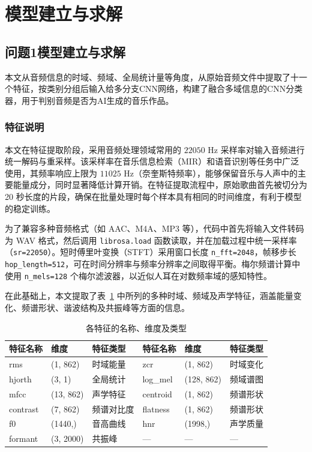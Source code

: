 \documentclass[a4paper,12pt]{article}
\begin{document}
\section{模型建立与求解}
\subsection{问题1模型建立与求解}
本文从音频信息的时域、频域、全局统计量等角度，从原始音频文件中提取了十一个特征，按类别分组后输入给多分支CNN网络，构建了融合多域信息的CNN分类器，用于判别音频是否为AI生成的音乐作品。


\subsubsection{特征说明}
本文在特征提取阶段，采用音频处理领域常用的 $22050$ Hz 采样率对输入音频进行统一解码与重采样。该采样率在音乐信息检索（MIR）和语音识别等任务中广泛使用，其频率响应上限为 $11025$ Hz（奈奎斯特频率），能够保留音乐与人声中的主要能量成分，同时显著降低计算开销。在特征提取流程中，原始歌曲首先被切分为 20 秒长度的片段，确保在批量处理时每个样本具有相同的时间维度，有利于模型的稳定训练。

为了兼容多种音频格式（如 AAC、M4A、MP3 等），代码中首先将输入文件转码为 WAV 格式，然后调用 \texttt{librosa.load} 函数读取，并在加载过程中统一采样率（\texttt{sr=22050}）。短时傅里叶变换（STFT）采用窗口长度 \texttt{n\_fft=2048}，帧移步长 \texttt{hop\_length=512}，可在时间分辨率与频率分辨率之间取得平衡。梅尔频谱计算中使用 \texttt{n\_mels=128} 个梅尔滤波器，以近似人耳在对数频率域的感知特性。

在此基础上，本文提取了表~\ref{tab:audio-features} 中所列的多种时域、频域及声学特征，涵盖能量变化、频谱形状、谐波结构及共振峰等方面的信息。

\begin{table}[h]
  \centering
  \begin{tabular}{lll lll}
    \toprule
    特征名称 & 维度 & 特征类型 & 特征名称 & 维度 & 特征类型 \\
    \midrule
    rms       & (1, 862)   & 时域能量    & zcr       & (1, 862)   & 时域变化       \\
    hjorth    & (3, 1)     & 全局统计    & log\_mel  & (128, 862) & 频域谱图       \\
    mfcc      & (13, 862)  & 声学特征    & centroid  & (1, 862)   & 频谱形状       \\
    contrast  & (7, 862)   & 频谱对比度  & flatness  & (1, 862)   & 频谱形状       \\
    f0        & (1440,)    & 音高曲线    & hnr       & (1998,)    & 声学质量       \\
    formant   & (3, 2000)  & 共振峰      & —         & —          & —             \\
    \bottomrule
  \end{tabular}
  \caption{各特征的名称、维度及类型}
  \label{tab:audio-features}
\end{table}
\end{document}
